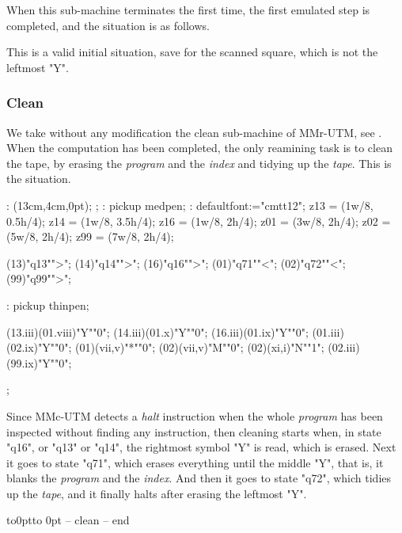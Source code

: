 When this sub-machine terminates the first time,
the first emulated step is completed, and the situation is as follows.

\nextsituation

\continuepar
This is a valid initial situation, save for the scanned square,
which is not the leftmost "Y".

\vfill\break


\subsubsection{Clean}

We take without any modification the clean sub-machine of MMr-UTM,
see .
When the computation has been completed,
the only reamining task is to clean the tape,
by erasing the {\em program} and the {\em index}
and tidying up the {\em tape}.
This is the situation.

\nextsituation

\MT:
\MTbeginfig(13cm,4cm,0pt);
\MTresetpa;
\MT: pickup medpen;
\MT: defaultfont:="cmtt12";
\MTcode
 z13 = (1w/8, 0.5h/4);
 z14 = (1w/8, 3.5h/4);
 z16 = (1w/8, 2h/4);
 z01 = (3w/8, 2h/4);
 z02 = (5w/8, 2h/4);
 z99 = (7w/8, 2h/4);

\MTstate(13)"q13"">";
\MTstate(14)"q14"">";
\MTstate(16)"q16"">";
\MTstate(01)"q71""<";
\MTstate(02)"q72""<";
\MTstate(99)"q99"">";

\MT: pickup thinpen;

\MTinput(13.iii)(01.viii)"Y""0";
\MTinput(14.iii)(01.x)"Y""0";
\MTinput(16.iii)(01.ix)"Y""0";
\MTinput(01.iii)(02.ix)"Y""0";
\MTauto(01)(vii,v)"*""0";
\MTauto(02)(vii,v)"M""0";
\MTauto(02)(xi,i)"N""1";
\MTinput(02.iii)(99.ix)"Y""0";

\MTendfig;

Since MMc-UTM detects a {\em halt} instruction when the whole {\em program}
has been inspected without finding any instruction,
then cleaning starts when, in state "q16", or "q13" or "q14",
the rightmost symbol "Y" is read, which is erased.
Next it goes to state "q71", which erases
everything until the middle "Y", that is,
it blanks the {\em program} and the {\em index}.
And then it goes to state "q72", which tidies up the {\em tape},
and it finally halts after erasing the leftmost "Y".
\par\kern0pt\vbox to0pt{\kern-15pt\hbox to 0pt{\kern3.75cm\box\MTbox\hss}\vss}
-- clean
-- end

